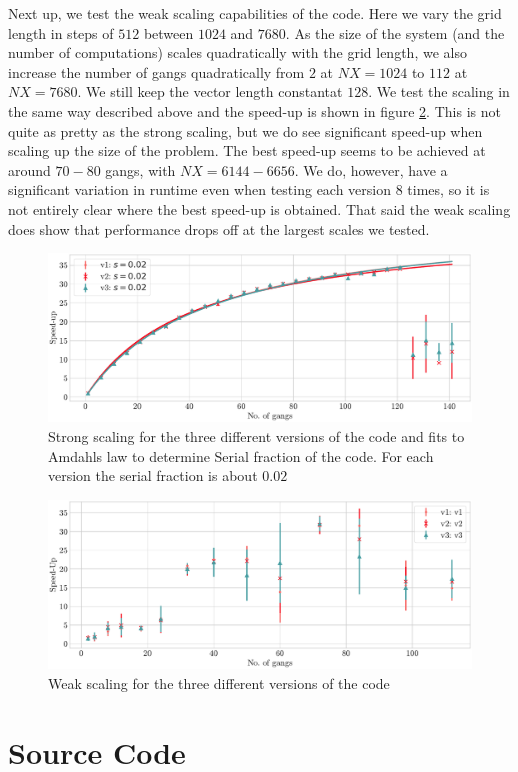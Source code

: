 \documentclass{article}
\begin{document}
Next up, we test the weak scaling capabilities of the code. Here we vary the grid length in steps of $512$ between $1024$ and $7680$. As the size of the system (and the number of computations) scales quadratically with the grid length, we also increase the number of gangs quadratically from $2$ at $NX=1024$ to $112$ at $NX=7680$. We still keep the vector length constantat $128$. We test the scaling in the same way described above and the speed-up is shown in figure \ref{fig:weak}. This is not quite as pretty as the strong scaling, but we do see significant speed-up when scaling up the size of the problem. The best speed-up seems to be achieved at around $70-80$ gangs, with $NX=6144-6656$. We do, however, have a significant variation in runtime even when testing each version $8$ times, so it is not entirely clear where the best speed-up is obtained. That said the weak scaling does show that performance drops off at the largest scales we tested.
\begin{figure}
    \centering
    \includegraphics[width=\textwidth]{Assignment_5_shallow_water/Report/figures/amdahl.pdf}
    \caption{Strong scaling for the three different versions of the code and fits to Amdahls law to determine Serial fraction of the code. For each version the serial fraction is about $0.02$}
    \label{fig:strong}
\end{figure}
\begin{figure}
    \centering
    \includegraphics[width=\textwidth]{Assignment_5_shallow_water/Report/figures/weak_scaling_corrected.pdf}
    \caption{Weak scaling for the three different versions of the code}
    \label{fig:weak}
\end{figure}


\FloatBarrier
\section{Source Code}
\label{sec:source}

\end{document}
